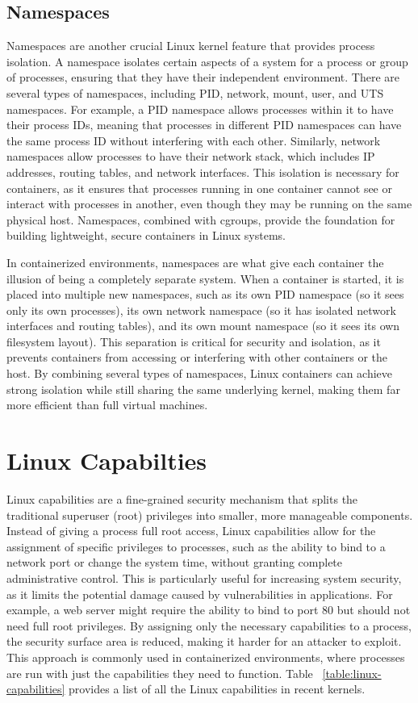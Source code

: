\documentclass[12pt]{report}
\begin{document}
\begin{doublespace}
\subsection{Namespaces}
Namespaces are another crucial Linux kernel feature that provides process isolation. A namespace isolates certain aspects of a system for a process or group of processes, ensuring that they have their independent environment. There are several types of namespaces, including PID, network, mount, user, and UTS namespaces. For example, a PID namespace allows processes within it to have their process IDs, meaning that processes in different PID namespaces can have the same process ID without interfering with each other. Similarly, network namespaces allow processes to have their network stack, which includes IP addresses, routing tables, and network interfaces. This isolation is necessary for containers, as it ensures that processes running in one container cannot see or interact with processes in another, even though they may be running on the same physical host. Namespaces, combined with cgroups, provide the foundation for building lightweight, secure containers in Linux systems.

In containerized environments, namespaces are what give each container the illusion of being a completely separate system. When a container is started, it is placed into multiple new namespaces, such as its own PID namespace (so it sees only its own processes), its own network namespace (so it has isolated network interfaces and routing tables), and its own mount namespace (so it sees its own filesystem layout). This separation is critical for security and isolation, as it prevents containers from accessing or interfering with other containers or the host. By combining several types of namespaces, Linux containers can achieve strong isolation while still sharing the same underlying kernel, making them far more efficient than full virtual machines.

\section{Linux Capabilties}
Linux capabilities are a fine-grained security mechanism that splits the traditional superuser (root) privileges into smaller, more manageable components. Instead of giving a process full root access, Linux capabilities allow for the assignment of specific privileges to processes, such as the ability to bind to a network port or change the system time, without granting complete administrative control. This is particularly useful for increasing system security, as it limits the potential damage caused by vulnerabilities in applications. For example, a web server might require the ability to bind to port 80 but should not need full root privileges. By assigning only the necessary capabilities to a process, the security surface area is reduced, making it harder for an attacker to exploit. This approach is commonly used in containerized environments, where processes are run with just the capabilities they need to function. Table ~\ref{table:linux-capabilities} provides a list of all the Linux capabilities in recent kernels.


\end{doublespace}
\end{document}
